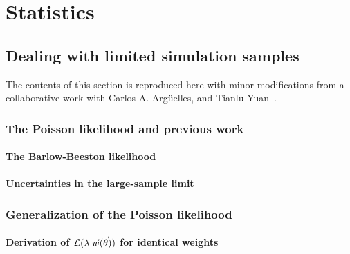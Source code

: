 \chapter{Statistics}\label{chapter:statistics}

\section{Dealing with limited simulation samples\label{sec:limited_simulation}}
The contents of this section is reproduced here with minor modifications from a collaborative work with Carlos A. Argüelles, and Tianlu Yuan~\cite{Arguelles:2019izp}.

\begingroup
\graphicspath{{results/mcllh_paper/}}

\endgroup

\subsection{The Poisson likelihood and previous work\label{sec:mc_intro}}
\begingroup
\graphicspath{{results/mcllh_paper/}}

\endgroup

\subsubsection{The Barlow-Beeston likelihood}
\begingroup
\graphicspath{{results/mcllh_paper/}}

\endgroup

\subsubsection{Uncertainties in the large-sample limit}
\begingroup
\graphicspath{{results/mcllh_paper/}}

\endgroup

\subsection{Generalization of the Poisson likelihood\label{sec:generalization_poisson}}
\begingroup
\graphicspath{{results/mcllh_paper/}}

\endgroup

\subsubsection{Derivation of $\mathcal{L} (\lambda|\vec{w}(\vec{\theta}))$ for identical weights\label{sec:constructing}}
\begingroup
\graphicspath{{results/mcllh_paper/}}

\endgroup

